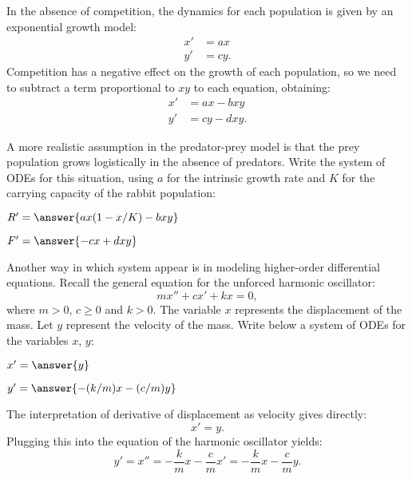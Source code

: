 \documentclass{ximera}
\begin{document}
\begin{explanation} 
In the absence of competition, the dynamics for each population is given by an exponential growth model:
\begin{align*}
x'&=ax\\
y'&=cy.
\end{align*}
Competition has a negative effect on the growth of each population, so we need to subtract a term proportional to $xy$ to each equation, obtaining:
\begin{align*}
x'&=ax-bxy\\
y'&=cy-dxy.
\end{align*}
\end{explanation}

\begin{problem}
A more realistic assumption in the predator-prey model is that the prey population grows logistically in the absence of predators. Write the system of ODEs for this situation, using $a$ for the intrinsic growth rate and $K$ for the carrying capacity of the rabbit population:
\begin{question}

$R'= \answer{ax(1-x/K)-bxy}$
\end{question}
\begin{question}

$F'= \answer{-cx+dxy}$
\end{question}
\end{problem}

\begin{problem} Another way in which system appear is in modeling higher-order differential equations. Recall the general equation for the unforced harmonic oscillator:
\[
mx''+cx'+kx=0,
\]
where $m>0$, $c\ge 0$ and $k>0$. The variable $x$ represents the displacement of the mass. Let $y$ represent the velocity of the mass. Write below a system of ODEs for the variables $x$, $y$:

\begin{question}
$x'= \answer{y}$
\end{question}

\begin{question}
$y'= \answer{-(k/m)x-(c/m)y}$
\end{question}

\begin{explanation} The interpretation of derivative of displacement as velocity gives directly:
\[
x'=y.
\]
Plugging this into the equation of the harmonic oscillator yields:
\[
y'=x''=-\frac{k}{m}x-\frac{c}{m}x'=-\frac{k}{m}x-\frac{c}{m}y.
\]
\end{explanation}
\end{problem}
\end{document}
